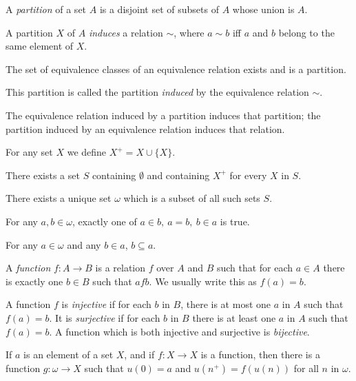 \begin{defn}
  A \emph{partition} of a set $A$ is a disjoint set of subsets of $A$ whose
  union is $A$.

  A partition $X$ of $A$ \emph{induces} a relation $\sim$, where $a\sim b$ iff
  $a$ and $b$ belong to the same element of $X$.
\end{defn}
\begin{prop}
  The set of equivalence classes of an equivalence relation exists and 
  is a partition.
\end{prop}
\begin{defn}
  This partition is called the partition \emph{induced} by the equivalence
  relation $\sim$.
\end{defn}
\begin{prop}
  The equivalence relation induced by a partition induces that partition; the
  partition induced by an equivalence relation induces that relation.
\end{prop}
\begin{defn}
  For any set $X$ we define $X^+=X\cup\{X\}$.
\end{defn}
\begin{axiom}[Infinity]
  There exists a set $S$ containing $\emptyset$ and containing $X^+$ for
  every $X$ in $S$.
\end{axiom}
\begin{prop}
  There exists a unique set $\omega$ which is a subset of all such sets $S$.
\end{prop}
\begin{prop}
  For any $a,b\in\omega$, exactly one of $a\in b,\ a=b,\ b\in a$ is true.
\end{prop}
\begin{prop}
  For any $a\in\omega$ and any $b\in a$, $b\subseteq a$.
\end{prop}
\begin{defn}
  A \emph{function} $f:A\to B$ is a relation $f$ over $A$ and $B$ such that
  for each $a\in A$ there is exactly one $b\in B$ such that $afb$. We usually
  write this as $f(a)=b$.

  A function $f$ is \emph{injective} if for each $b$ in $B$, there is at most one
  $a$ in $A$ such that $f(a)=b$. It is \emph{surjective} if for each $b$ in
  $B$ there is at least one $a$ in $A$ such that $f(a)=b$. A function which is
  both injective and surjective is \emph{bijective}.
\end{defn}
\begin{thm}
  If $a$ is an element of a set $X$, and if $f:X\to X$ is a function, then there
  is a function $g:\omega\to X$ such that $u(0)=a$ and $u(n^+)=f(u(n))$ for all
  $n$ in $\omega$.
\end{thm}
